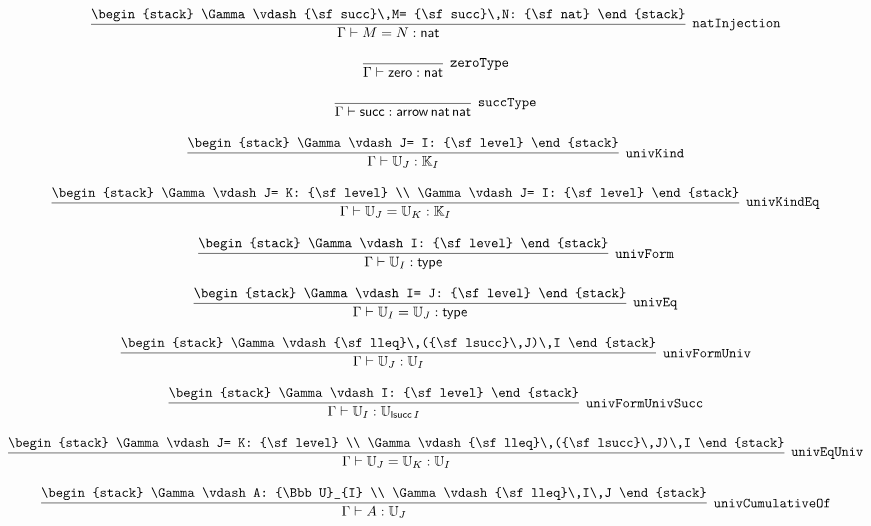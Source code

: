 \[
\infer[{\tt natInjection}]{\Gamma \vdash M= N: {\sf nat}}{
\begin{stack}
\Gamma \vdash {\sf succ}\,M= {\sf succ}\,N: {\sf nat}
\end{stack}}
\]

\[
\infer[{\tt zeroType}]{\Gamma \vdash {\sf zero}: {\sf nat}}{}
\]

\[
\infer[{\tt succType}]{\Gamma \vdash {\sf succ}: {\sf arrow}\,{\sf nat}\,{\sf nat}}{}
\]

\[
\infer[{\tt univKind}]{\Gamma \vdash {\Bbb U}_{J}: {\Bbb K}_{I}}{
\begin{stack}
\Gamma \vdash J= I: {\sf level}
\end{stack}}
\]

\[
\infer[{\tt univKindEq}]{\Gamma \vdash {\Bbb U}_{J}= {\Bbb U}_{K}: {\Bbb K}_{I}}{
\begin{stack}
\Gamma \vdash J= K: {\sf level}
\\
\Gamma \vdash J= I: {\sf level}
\end{stack}}
\]

\[
\infer[{\tt univForm}]{\Gamma \vdash {\Bbb U}_{I}: {\sf type}}{
\begin{stack}
\Gamma \vdash I: {\sf level}
\end{stack}}
\]

\[
\infer[{\tt univEq}]{\Gamma \vdash {\Bbb U}_{I}= {\Bbb U}_{J}: {\sf type}}{
\begin{stack}
\Gamma \vdash I= J: {\sf level}
\end{stack}}
\]

\[
\infer[{\tt univFormUniv}]{\Gamma \vdash {\Bbb U}_{J}: {\Bbb U}_{I}}{
\begin{stack}
\Gamma \vdash {\sf lleq}\,({\sf lsucc}\,J)\,I
\end{stack}}
\]

\[
\infer[{\tt univFormUnivSucc}]{\Gamma \vdash {\Bbb U}_{I}: {\Bbb U}_{{\sf lsucc}\,I}}{
\begin{stack}
\Gamma \vdash I: {\sf level}
\end{stack}}
\]

\[
\infer[{\tt univEqUniv}]{\Gamma \vdash {\Bbb U}_{J}= {\Bbb U}_{K}: {\Bbb U}_{I}}{
\begin{stack}
\Gamma \vdash J= K: {\sf level}
\\
\Gamma \vdash {\sf lleq}\,({\sf lsucc}\,J)\,I
\end{stack}}
\]

\[
\infer[{\tt univCumulativeOf}]{\Gamma \vdash A: {\Bbb U}_{J}}{
\begin{stack}
\Gamma \vdash A: {\Bbb U}_{I}
\\
\Gamma \vdash {\sf lleq}\,I\,J
\end{stack}}
\]

